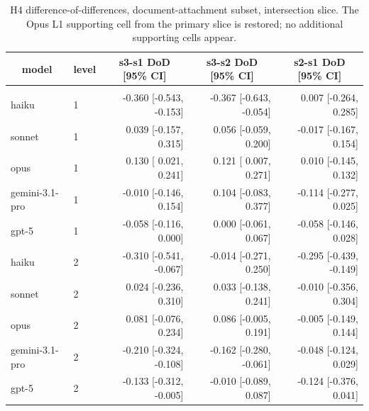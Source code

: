\documentclass[10pt]{article} %
\begin{document}
    \begin{table}[h]
        \caption{H4 difference-of-differences, document-attachment subset, intersection slice. The Opus L1 supporting cell from the primary slice is restored; no additional supporting cells appear.}
    \label{tab:h4_intersection}
    \begin{center}
    \small
    \begin{tabular}{llrrr}
        \multicolumn{1}{c}{\bf model} & \multicolumn{1}{c}{\bf level} & \multicolumn{1}{c}{\bf s3-s1 DoD [95\% CI]} & \multicolumn{1}{c}{\bf s3-s2 DoD [95\% CI]} & \multicolumn{1}{c}{\bf s2-s1 DoD [95\% CI]} \\
        \hline \\
        haiku          & 1 & -0.360 [-0.543, -0.153] & -0.367 [-0.643, -0.054] &  0.007 [-0.264,  0.285] \\
        sonnet         & 1 &  0.039 [-0.157,  0.315] &  0.056 [-0.059,  0.200] & -0.017 [-0.167,  0.154] \\
        opus           & 1 &  0.130 [ 0.021,  0.241] &  0.121 [ 0.007,  0.271] &  0.010 [-0.145,  0.132] \\
        gemini-3.1-pro & 1 & -0.010 [-0.146,  0.154] &  0.104 [-0.083,  0.377] & -0.114 [-0.277,  0.025] \\
        gpt-5          & 1 & -0.058 [-0.116,  0.000] &  0.000 [-0.061,  0.067] & -0.058 [-0.146,  0.028] \\
        haiku          & 2 & -0.310 [-0.541, -0.067] & -0.014 [-0.271,  0.250] & -0.295 [-0.439, -0.149] \\
        sonnet         & 2 &  0.024 [-0.236,  0.310] &  0.033 [-0.138,  0.241] & -0.010 [-0.356,  0.304] \\
        opus           & 2 &  0.081 [-0.076,  0.234] &  0.086 [-0.005,  0.191] & -0.005 [-0.149,  0.144] \\
        gemini-3.1-pro & 2 & -0.210 [-0.324, -0.108] & -0.162 [-0.280, -0.061] & -0.048 [-0.124,  0.029] \\
        gpt-5          & 2 & -0.133 [-0.312, -0.005] & -0.010 [-0.089,  0.087] & -0.124 [-0.376,  0.041] \\
    \end{tabular}
    \end{center}
    \end{table}
\end{document}
